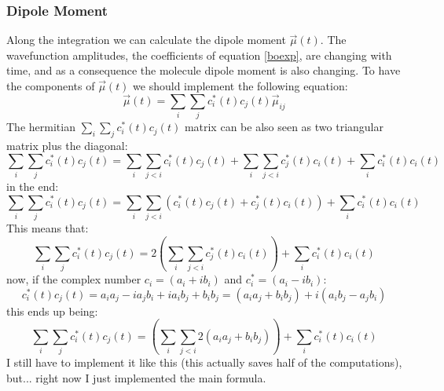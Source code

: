 \subsubsection{Dipole Moment}
Along the integration we can calculate the dipole moment $\vec{\mu}(t)$. The wavefunction amplitudes, the coefficients of equation \ref{boexp}, are changing with time, and as a consequence the molecule dipole moment is also changing. To have the components of $\vec{\mu}(t)$ we should implement the following equation:
\begin{equation}
\vec{\mu}(t) = \sum_i\sum_j c^*_i(t)c_j(t)\vec{\mu}_{ij}
\end{equation}
The hermitian $\sum_i\sum_j c^*_i(t)c_j(t)$ matrix can be also seen as two triangular matrix plus the diagonal:
\begin{equation}
\sum_i\sum_j c^*_i(t)c_j(t) = \sum_i\sum_{j<i} c^*_i(t)c_j(t) + \sum_i\sum_{j<i} c^*_j(t)c_i(t) + \sum_i c^*_i(t)c_i(t)
\end{equation}
in the end:
\begin{equation}
\sum_i\sum_j c^*_i(t)c_j(t) = \sum_i\sum_{j<i} (c^*_i(t)c_j(t) + c^*_j(t)c_i(t)) + \sum_i c^*_i(t)c_i(t)
\end{equation}
This means that:
\begin{equation}
\sum_i\sum_j c^*_i(t)c_j(t) = 2 \left(\sum_i\sum_{j<i} c^*_j(t)c_i(t)\right) + \sum_i c^*_i(t)c_i(t)
\end{equation}
now, if the complex number $c_i=(a_i+ib_i)$ and $c^*_i=(a_i-ib_i)$:
\begin{equation}
c^*_i(t)c_j(t) = a_i a_j - ia_j b_i + ia_i b_j + b_i b_j =  (a_i a_j + b_i b_j) + i(a_i b_j - a_j b_i)
\end{equation}
this ends up being:
\begin{equation}
\sum_i\sum_j c^*_i(t)c_j(t) = \left(\sum_i\sum_{j<i} 2(a_i a_j + b_i b_j)\right) + \sum_i c^*_i(t)c_i(t)
\end{equation}
I still have to implement it like this (this actually saves half of the computations), but... right now I just implemented the main formula.



